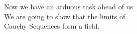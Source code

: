 \documentclass[preview]{standalone}
\begin{document}
\begin{center}
Now we have an arduous task ahead of us\\We are going to show that the limits of\\Cauchy Sequences form a field.
\end{center}
\end{document}
